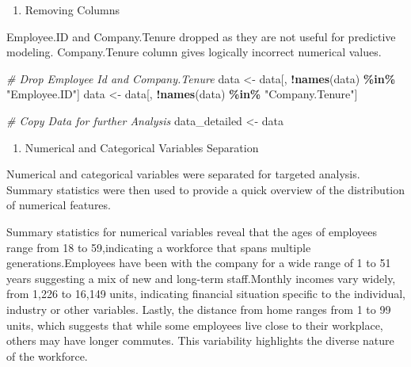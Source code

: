 \documentclass[
  10pt,
  paper=a4,
  ,captions=tableheading
]{scrartcl}
\newenvironment{Shaded}{\begin{snugshade}}{\end{snugshade}}
\newcommand{\CommentTok}[1]{\textcolor[rgb]{0.56,0.35,0.01}{\textit{#1}}}
\newcommand{\FunctionTok}[1]{\textcolor[rgb]{0.13,0.29,0.53}{\textbf{#1}}}
\newcommand{\NormalTok}[1]{#1}
\newcommand{\OtherTok}[1]{\textcolor[rgb]{0.56,0.35,0.01}{#1}}
\newcommand{\SpecialCharTok}[1]{\textcolor[rgb]{0.81,0.36,0.00}{\textbf{#1}}}
\newcommand{\StringTok}[1]{\textcolor[rgb]{0.31,0.60,0.02}{#1}}
\providecommand{\tightlist}{%
  \setlength{\itemsep}{0pt}\setlength{\parskip}{0pt}}
\begin{document}
\begin{enumerate}
\def\labelenumi{\arabic{enumi}.}
\tightlist
\item
  Removing Columns
\end{enumerate}

Employee.ID and Company.Tenure dropped as they are not useful for
predictive modeling. Company.Tenure column gives logically incorrect
numerical values.

\small

\begin{Shaded}
\begin{Highlighting}[]
\CommentTok{\# Drop Employee Id and Company.Tenure}
\NormalTok{data }\OtherTok{\textless{}{-}}\NormalTok{ data[, }\SpecialCharTok{!}\FunctionTok{names}\NormalTok{(data) }\SpecialCharTok{\%in\%} \StringTok{"Employee.ID"}\NormalTok{]}
\NormalTok{data }\OtherTok{\textless{}{-}}\NormalTok{ data[, }\SpecialCharTok{!}\FunctionTok{names}\NormalTok{(data) }\SpecialCharTok{\%in\%} \StringTok{"Company.Tenure"}\NormalTok{]}

\CommentTok{\# Copy Data for further Analysis}
\NormalTok{data\_detailed }\OtherTok{\textless{}{-}}\NormalTok{ data}
\end{Highlighting}
\end{Shaded}

\small

\begin{enumerate}
\def\labelenumi{\arabic{enumi}.}
\setcounter{enumi}{1}
\tightlist
\item
  Numerical and Categorical Variables Separation
\end{enumerate}

Numerical and categorical variables were separated for targeted
analysis. Summary statistics were then used to provide a quick overview
of the distribution of numerical features.

Summary statistics for numerical variables reveal that the ages of
employees range from 18 to 59,indicating a workforce that spans multiple
generations.Employees have been with the company for a wide range of 1
to 51 years suggesting a mix of new and long-term staff.Monthly incomes
vary widely, from 1,226 to 16,149 units, indicating financial situation
specific to the individual, industry or other variables. Lastly, the
distance from home ranges from 1 to 99 units, which suggests that while
some employees live close to their workplace, others may have longer
commutes. This variability highlights the diverse nature of the
workforce.
\end{document}
